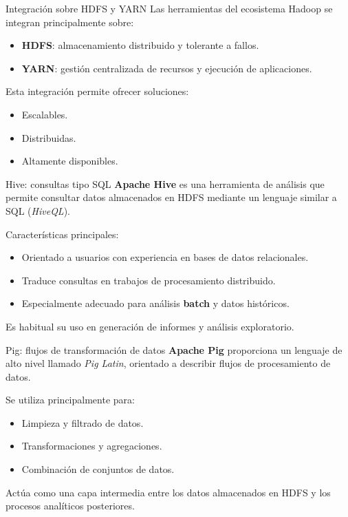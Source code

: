 \documentclass{beamer}
\begin{document}
\begin{frame}{Integración sobre HDFS y YARN}
Las herramientas del ecosistema Hadoop se integran principalmente sobre:
\begin{itemize}
    \item \textbf{HDFS}: almacenamiento distribuido y tolerante a fallos.
    \item \textbf{YARN}: gestión centralizada de recursos y ejecución de aplicaciones.
\end{itemize}

Esta integración permite ofrecer soluciones:
\begin{itemize}
    \item Escalables.
    \item Distribuidas.
    \item Altamente disponibles.
\end{itemize}
\end{frame}

\begin{frame}{Hive: consultas tipo SQL}
\textbf{Apache Hive} es una herramienta de análisis que permite consultar datos almacenados en HDFS mediante un lenguaje similar a SQL (\textit{HiveQL}).

Características principales:
\begin{itemize}
    \item Orientado a usuarios con experiencia en bases de datos relacionales.
    \item Traduce consultas en trabajos de procesamiento distribuido.
    \item Especialmente adecuado para análisis \textbf{batch} y datos históricos.
\end{itemize}

Es habitual su uso en generación de informes y análisis exploratorio.
\end{frame}

\begin{frame}{Pig: flujos de transformación de datos}
\textbf{Apache Pig} proporciona un lenguaje de alto nivel llamado \textit{Pig Latin}, orientado a describir flujos de procesamiento de datos.

Se utiliza principalmente para:
\begin{itemize}
    \item Limpieza y filtrado de datos.
    \item Transformaciones y agregaciones.
    \item Combinación de conjuntos de datos.
\end{itemize}

Actúa como una capa intermedia entre los datos almacenados en HDFS y los procesos analíticos posteriores.
\end{frame}
\end{document}

